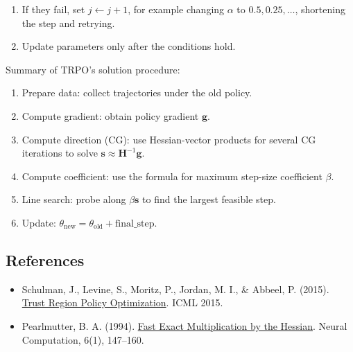 \begin{enumerate}
\def\labelenumi{\arabic{enumi}.}
\setcounter{enumi}{3}
\tightlist
\item
  If they fail, set \(j\leftarrow j+1\), for example changing \(\alpha\) to \(0.5,0.25,\ldots\), shortening the step and retrying.
\item
  Update parameters only after the conditions hold.
\end{enumerate}

Summary of TRPO's solution procedure:

\begin{enumerate}
\def\labelenumi{\arabic{enumi}.}
\tightlist
\item
  Prepare data: collect trajectories under the old policy.
\item
  Compute gradient: obtain policy gradient \(\mathbf{g}\).
\item
  Compute direction (CG): use Hessian-vector products for several CG iterations to solve \(\mathbf{s}\approx\mathbf{H}^{-1}\mathbf{g}\).
\item
  Compute coefficient: use the formula for maximum step-size coefficient \(\beta\).
\item
  Line search: probe along \(\beta\mathbf{s}\) to find the largest feasible step.
\item
  Update: \(\theta_{\mathrm{new}}=\theta_{\mathrm{old}}+\mathrm{final\_step}\).
\end{enumerate}

\FloatBarrier
{}
\hypertarget{references-57}{%
\subsection{References}\label{references-57}}

\vspace{0.25em}
\begin{itemize}
\tightlist
\item
  Schulman, J., Levine, S., Moritz, P., Jordan, M. I., \& Abbeel, P. (2015). \href{https://arxiv.org/abs/1502.05477}{Trust Region Policy Optimization}. ICML 2015.
\item
  Pearlmutter, B. A. (1994). \href{https://doi.org/10.1162/neco.1994.6.1.147}{Fast Exact Multiplication by the Hessian}. Neural Computation, 6(1), 147--160.
\end{itemize}

\clearpage

